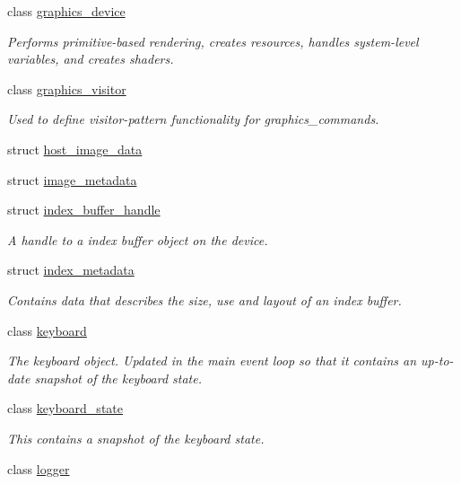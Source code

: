 \begin{DoxyCompactItemize}
class \mbox{\hyperlink{classmoka_1_1graphics__device}{graphics\+\_\+device}}
\begin{DoxyCompactList}\small\item\em Performs primitive-\/based rendering, creates resources, handles system-\/level variables, and creates shaders. \end{DoxyCompactList}\item 
class \mbox{\hyperlink{classmoka_1_1graphics__visitor}{graphics\+\_\+visitor}}
\begin{DoxyCompactList}\small\item\em Used to define visitor-\/pattern functionality for graphics\+\_\+commands. \end{DoxyCompactList}\item 
struct \mbox{\hyperlink{structmoka_1_1host__image__data}{host\+\_\+image\+\_\+data}}
\item 
struct \mbox{\hyperlink{structmoka_1_1image__metadata}{image\+\_\+metadata}}
\item 
struct \mbox{\hyperlink{structmoka_1_1index__buffer__handle}{index\+\_\+buffer\+\_\+handle}}
\begin{DoxyCompactList}\small\item\em A handle to a index buffer object on the device. \end{DoxyCompactList}\item 
struct \mbox{\hyperlink{structmoka_1_1index__metadata}{index\+\_\+metadata}}
\begin{DoxyCompactList}\small\item\em Contains data that describes the size, use and layout of an index buffer. \end{DoxyCompactList}\item 
class \mbox{\hyperlink{classmoka_1_1keyboard}{keyboard}}
\begin{DoxyCompactList}\small\item\em The keyboard object. Updated in the main event loop so that it contains an up-\/to-\/date snapshot of the keyboard state. \end{DoxyCompactList}\item 
class \mbox{\hyperlink{classmoka_1_1keyboard__state}{keyboard\+\_\+state}}
\begin{DoxyCompactList}\small\item\em This contains a snapshot of the keyboard state. \end{DoxyCompactList}\item 
class \mbox{\hyperlink{classmoka_1_1logger}{logger}}

\end{DoxyCompactItemize}
